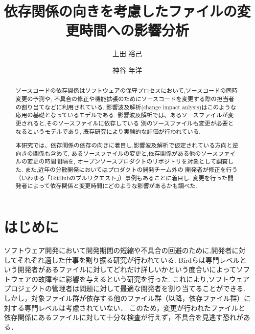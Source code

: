 \documentclass{fose2016}           %
\title{依存関係の向きを考慮したファイルの変更時間への影響分析}
\author{上田 裕己}{Ueda Yuki, 島根大学}
\author{神谷 年洋}{Kamiya Toshihiro, 島根大学}
\begin{document}
\maketitle

\begin{abstract}


 


ソースコードの依存関係はソフトウェアの保守プロセスにおいて,ソースコードの同時変更の予測や,
不具合の修正や機能拡張のためにソースコードを変更する際の担当者の割り当てなどに利用されている.
影響波及解析(change impact anlysis)はこのような応用の基礎となっているモデルである.
影響波及解析では、あるソースファイルが変更されると,そのソースファイルに依存している
別のソースファイルも変更が必要となるというモデルであり,
既存研究により実験的な評価が行われている.

本研究では、依存関係の依存の向きに着目し,影響波及解析で仮定されている方向と逆向きの関係も含めて,
あるソースファイルの変更と,依存関係がある他のソースファイルの変更の時間間隔を,
オープンソースプロダクトのリポジトリを対象として調査した.
また,近年の分散開発においてはプロダクトの開発チーム外の
開発者が修正を行う（いわゆる「GitHubのプルリクエスト」）事例もあることに着目し,
変更を行った開発者によって依存関係と変更時間にどのような影響があるかも調べた.

\end{abstract}

\begin{eabstract}

\end{eabstract}

\section{はじめに} 
ソフトウェア開発において開発期間の短縮や不具合の回避のために,開発者に対してそれぞれ適した仕事を割り振る研究が行われている.\cite{Bird,Patanamon}
Bird\cite{Bird}らは専門レベルという開発者があるファイルに対してどれだけ詳しいかという度合いによってソフトウェアの故障率に影響を与えるという研究を行った.
これにより,ソフトウェアプロジェクトの管理者は問題に対して最適な開発者を割り当てることができる.
しかし，対象ファイル群が依存する他のファイル群（以降，依存ファイル群）に対する専門レベルは考慮されていない．
このため，変更が行われたファイルと依存関係にあるファイルに対して十分な検査が行えず，不具合を見逃す恐れがある．
\end{document}
